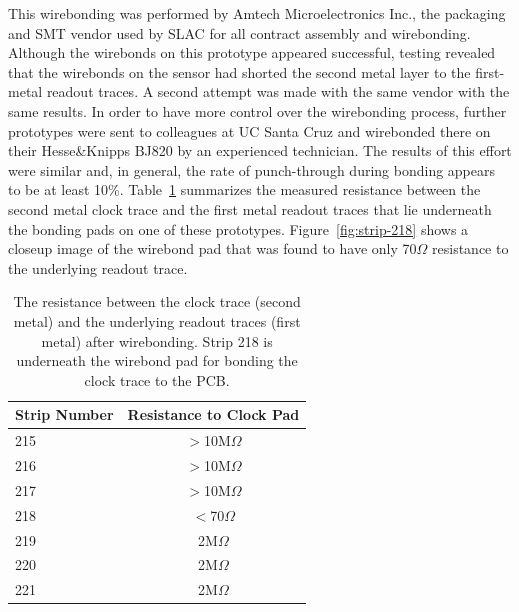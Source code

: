 \documentclass[prc,12pt,nofootinbib,letterpaper]{revtex4}
\begin{document}
This wirebonding was performed by Amtech Microelectronics Inc., the packaging and SMT vendor used by SLAC for all contract assembly and wirebonding.  Although the wirebonds on this prototype appeared successful, testing revealed that the wirebonds on the sensor had shorted the second metal layer to the first-metal readout traces. A second attempt was made with the same vendor with the same results.  In order to have more control over the wirebonding process, further prototypes were sent to colleagues at UC Santa Cruz and wirebonded there on their Hesse\&Knipps BJ820 by an experienced technician.  The results of this effort were similar and, in general, the rate of punch-through during bonding appears to be at least 10\%. Table~\ref{tab:shorts} summarizes the measured resistance between the second metal clock trace and the first metal readout traces that lie underneath the bonding pads on one of these prototypes. Figure~\ref{fig:strip-218} shows a closeup image of the wirebond pad that was found to have only 70$\Omega$ resistance to the underlying readout trace.
\begin{table}[htb]
\begin{center}
\begin{tabular}{lc}   
\hline \hline 
Strip Number & Resistance to Clock Pad \\      
\hline
215 & $>$10M$\Omega$ \\
216 & $>$10M$\Omega$ \\
217 & $>$10M$\Omega$ \\
218 & $<$70$\Omega$ \\
219 & 2M$\Omega$ \\
220 & 2M$\Omega$ \\
221 & 2M$\Omega$ \\
\hline \hline
\end{tabular}
\caption[]{The resistance between the clock trace (second metal) and the underlying readout traces (first metal) after wirebonding.  Strip 218 is underneath the wirebond pad for bonding the clock trace to the PCB.}
\label{tab:shorts} 
\end{center}
\end{table}
\end{document}
